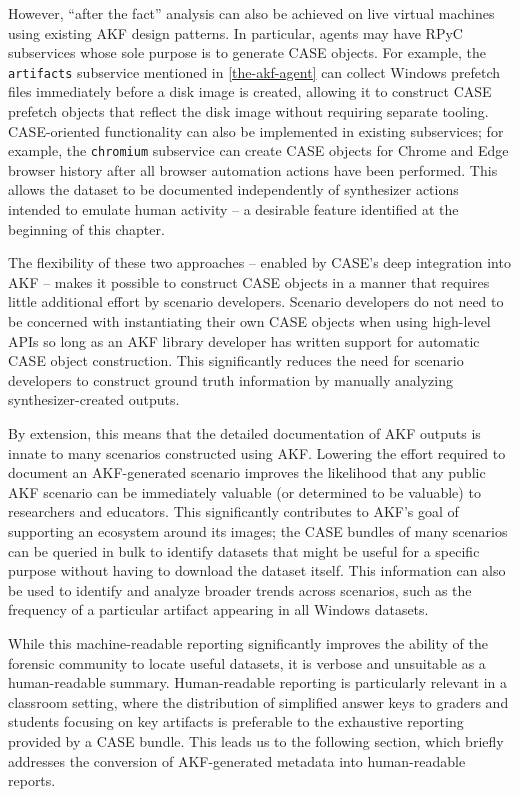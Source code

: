 However, ``after the fact'' analysis can also be achieved on live
virtual machines using existing AKF design patterns. In particular,
agents may have RPyC subservices whose sole purpose is to generate CASE
objects. For example, the \passthrough{\lstinline!artifacts!} subservice
mentioned in \autoref{the-akf-agent}
can collect Windows prefetch files immediately before a disk image is
created, allowing it to construct CASE prefetch objects that reflect the
disk image without requiring separate tooling. CASE-oriented
functionality can also be implemented in existing subservices; for
example, the \passthrough{\lstinline!chromium!} subservice can create
CASE objects for Chrome and Edge browser history after all browser
automation actions have been performed. This allows the dataset to be
documented independently of synthesizer actions intended to emulate
human activity -- a desirable feature identified at the beginning of
this chapter.

The flexibility of these two approaches -- enabled by CASE's deep
integration into AKF -- makes it possible to construct CASE objects in a
manner that requires little additional effort by scenario developers.
Scenario developers do not need to be concerned with instantiating their
own CASE objects when using high-level APIs so long as an AKF library
developer has written support for automatic CASE object construction.
This significantly reduces the need for scenario developers to construct
ground truth information by manually analyzing synthesizer-created
outputs.

By extension, this means that the detailed documentation of AKF outputs
is innate to many scenarios constructed using AKF. Lowering the effort
required to document an AKF-generated scenario improves the likelihood
that any public AKF scenario can be immediately valuable (or determined
to be valuable) to researchers and educators. This significantly
contributes to AKF's goal of supporting an ecosystem around its images;
the CASE bundles of many scenarios can be queried in bulk to identify
datasets that might be useful for a specific purpose without having to
download the dataset itself. This information can also be used to
identify and analyze broader trends across scenarios, such as the
frequency of a particular artifact appearing in all Windows datasets.

While this machine-readable reporting significantly improves the ability
of the forensic community to locate useful datasets, it is verbose and
unsuitable as a human-readable summary. Human-readable reporting is
particularly relevant in a classroom setting, where the distribution of
simplified answer keys to graders and students focusing on key artifacts
is preferable to the exhaustive reporting provided by a CASE bundle.
This leads us to the following section, which briefly addresses the
conversion of AKF-generated metadata into human-readable reports.

